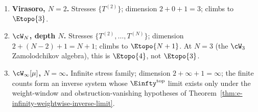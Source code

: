 \begin{proposition}
\begin{enumerate}[label=\textup{(\roman*)}]
\item \textbf{Virasoro, $N = 2$.} Stresses $\{T^{(2)}\}$; dimension
$2 + 0 + 1 = 3$; climbs to $\Etopo{3}$.
\item \textbf{$\cW_N$, depth $N$.} Stresses $\{T^{(2)}, \ldots, T^{(N)}\}$;
dimension $2 + (N - 2) + 1 = N + 1$; climbs to $\Etopo{N+1}$. At $N = 3$
(the $\cW_3$ Zamolodchikov algebra), this is $\Etopo{4}$, not $\Etopo{3}$.
\item \textbf{$\cW_\infty[\mu]$, $N = \infty$.} Infinite stress family;
dimension $2 + \infty + 1 = \infty$; the finite counts form an
inverse system whose $\Einfty^{\mathrm{top}}$ limit exists only under
the weight-window and obstruction-vanishing hypotheses of
Theorem~\ref{thm:e-infinity-weightwise-inverse-limit}.
\end{enumerate}
\end{proposition}

